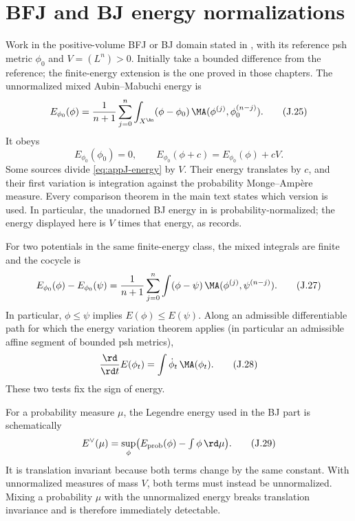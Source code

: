 \section{BFJ and BJ energy normalizations}
\label{sec:appJ-energy}

Work in the positive-volume BFJ or BJ domain stated in
, with its reference psh metric
\(\phi_0\) and \(V=(L^n)>0\). Initially take a bounded difference
from the reference; the finite-energy extension is the one proved in those
chapters. The unnormalized mixed Aubin--Mabuchi energy is
\begin{equation*}
 E_{\phi_0}(\phi)
 =\frac1{n+1}\sum_{j=0}^n
   \int_{X^{\An}}(\phi-\phi_0)\,
   \MA(\phi^{(j)},\phi_0^{(n-j)}).
 \tag{J.25}\label{eq:appJ-energy}
\end{equation*}
It obeys
\begin{equation*}
 E_{\phi_0}(\phi_0)=0,
 \qquad
 E_{\phi_0}(\phi+c)=E_{\phi_0}(\phi)+cV.
 \tag{J.26}\label{eq:appJ-energy-translation}
\end{equation*}
Some sources divide \eqref{eq:appJ-energy} by \(V\).  Their energy translates
by \(c\), and their first variation is integration against the probability
Monge--Amp\`ere measure.  Every comparison theorem in the main text states
which version is used. In particular, the unadorned BJ energy in
 is probability-normalized; the energy displayed
here is \(V\) times that energy, as 
records.

For two potentials in the same finite-energy class, the mixed integrals
are finite and the cocycle is
\begin{equation*}
 E_{\phi_0}(\phi)-E_{\phi_0}(\psi)
 =\frac1{n+1}\sum_{j=0}^n
   \int(\phi-\psi)\,
   \MA(\phi^{(j)},\psi^{(n-j)}).
 \tag{J.27}\label{eq:appJ-energy-cocycle}
\end{equation*}
In particular, \(\phi\leq\psi\) implies \(E(\phi)\leq E(\psi)\).  Along an admissible differentiable path for which the energy variation
theorem applies (in particular an admissible affine segment of bounded psh metrics),
\begin{equation*}
 \frac{\rd}{\rd t}E(\phi_t)
 =\int\dot\phi_t\,\MA(\phi_t).
 \tag{J.28}\label{eq:appJ-energy-variation}
\end{equation*}
These two tests fix the sign of energy.

For a probability measure \(\mu\), the Legendre energy used in the BJ part is
schematically
\begin{equation*}
 E^\vee(\mu)=
 \sup_{\phi}\bigl(E_{\mathrm{prob}}(\phi)-\textstyle\int\phi\,\rd \mu\bigr).
 \tag{J.29}\label{eq:appJ-dual-energy}
\end{equation*}
It is translation invariant because both terms change by the same constant.
With unnormalized measures of mass \(V\), both terms must instead be
unnormalized.  Mixing a probability \(\mu\) with the unnormalized energy
breaks translation invariance and is therefore immediately detectable.

